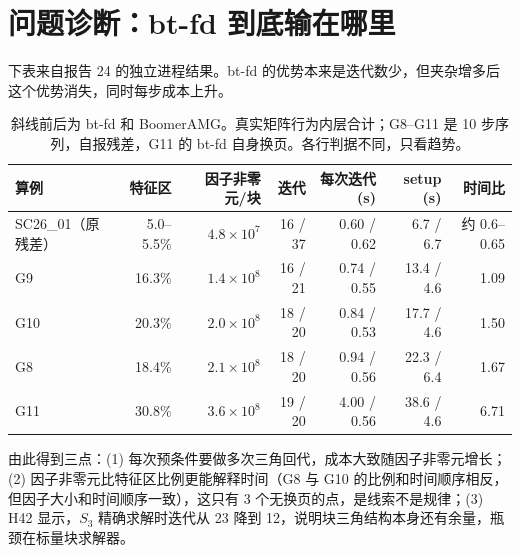 \documentclass[11pt,a4paper]{ctexart}
\begin{document}
\section{问题诊断：bt-fd 到底输在哪里}
下表来自报告 24 的独立进程结果。bt-fd 的优势本来是迭代数少，但夹杂增多后这个优势消失，同时每步成本上升。

\begin{table}[H]
\centering\footnotesize\setlength{\tabcolsep}{3pt}
\begin{tabular}{lrrrrrr}
\toprule
算例 & 特征区 & 因子非零元/块 & 迭代 & 每次迭代 (s) & setup (s) & 时间比 \\
\midrule
SC26\_01（原残差） & 5.0--5.5\% & $4.8\times10^{7}$ & 16 / 37 & 0.60 / 0.62 & 6.7 / 6.7 & 约 0.6--0.65 \\
G9 & 16.3\% & $1.4\times10^{8}$ & 16 / 21 & 0.74 / 0.55 & 13.4 / 4.6 & 1.09 \\
G10 & 20.3\% & $2.0\times10^{8}$ & 18 / 20 & 0.84 / 0.53 & 17.7 / 4.6 & 1.50 \\
G8 & 18.4\% & $2.1\times10^{8}$ & 18 / 20 & 0.94 / 0.56 & 22.3 / 6.4 & 1.67 \\
G11 & 30.8\% & $3.6\times10^{8}$ & 19 / 20 & 4.00 / 0.56 & 38.6 / 4.6 & 6.71 \\
\bottomrule
\end{tabular}
\caption{斜线前后为 bt-fd 和 BoomerAMG。真实矩阵行为内层合计；G8--G11 是 10 步序列，自报残差，G11 的 bt-fd 自身换页。各行判据不同，只看趋势。}
\end{table}

由此得到三点：(1) 每次预条件要做多次三角回代，成本大致随因子非零元增长；(2) 因子非零元比特征区比例更能解释时间（G8 与 G10 的比例和时间顺序相反，但因子大小和时间顺序一致），这只有 3 个无换页的点，是线索不是规律；(3) H42 显示，$S_3$ 精确求解时迭代从 23 降到 12，说明块三角结构本身还有余量，瓶颈在标量块求解器。
\end{document}
